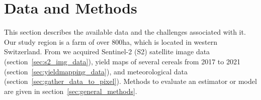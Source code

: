 \chapter{Data and Methods}\label{sec:data_methods}
{
	This section describes the available data and the challenges associated with it.
	Our study region is a farm of over 800ha, which is located in western Switzerland. From \cite{perichPixelbasedCropYield2022}  we acquired Sentinel-2 (S2) satellite image data (section~\ref{sec:s2_img_data}), yield maps of several cereals from 2017 to 2021 (section~\ref{sec:yieldmapping_data}), and meteorological data (section~\ref{sec:gather_data_to_pixel}). Methods to evaluate an estimator or model are given in section~\ref{sec:general_methods}.
	
}


